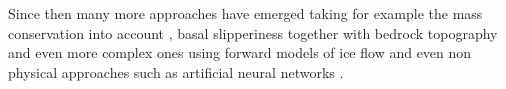 Since then many more approaches have emerged taking for example the mass conservation into account \cite{rasmussen_1988}, basal slipperiness together with bedrock topography \cite{Gudmundsson2001} and even more complex ones using forward models of ice flow \cite{vanPelt2013} and even non physical approaches such as artificial neural networks \cite{Clarke2009}. 

%
%

